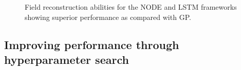 \documentclass[preprint,12pt]{elsarticle}
\begin{document}
\begin{figure}
	\centering
	\caption{Field reconstruction abilities for the NODE and LSTM frameworks showing superior performance as compared with GP.}
	\label{Figure12}
\end{figure}

\subsection{Improving performance through hyperparameter search}
\end{document}
